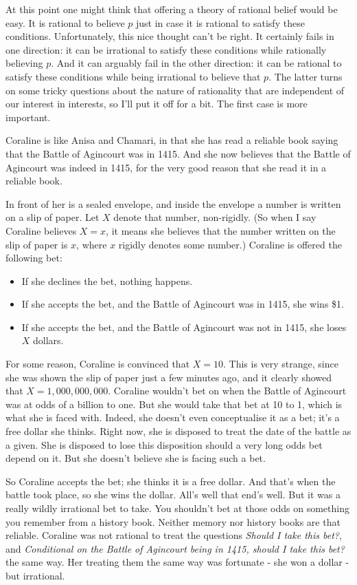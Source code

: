 \documentclass[11pt,]{book}
\providecommand{\tightlist}{%
  \setlength{\itemsep}{0pt}\setlength{\parskip}{0pt}}
\begin{document}
At this point one might think that offering a theory of rational belief would be easy. It is rational to believe \(p\) just in case it is rational to satisfy these conditions. Unfortunately, this nice thought can't be right. It certainly fails in one direction: it can be irrational to satisfy these conditions while rationally believing \(p\). And it can arguably fail in the other direction: it can be rational to satisfy these conditions while being irrational to believe that \(p\). The latter turns on some tricky questions about the nature of rationality that are independent of our interest in interests, so I'll put it off for a bit. The first case is more important.

Coraline is like Anisa and Chamari, in that she has read a reliable book saying that the Battle of Agincourt was in 1415. And she now believes that the Battle of Agincourt was indeed in 1415, for the very good reason that she read it in a reliable book.

In front of her is a sealed envelope, and inside the envelope a number is written on a slip of paper. Let \(X\) denote that number, non-rigidly. (So when I say Coraline believes \(X = x\), it means she believes that the number written on the slip of paper is \(x\), where \(x\) rigidly denotes some number.) Coraline is offered the following bet:

\begin{itemize}
\tightlist
\item
  If she declines the bet, nothing happens.
\item
  If she accepts the bet, and the Battle of Agincourt was in 1415, she wins \$1.
\item
  If she accepts the bet, and the Battle of Agincourt was not in 1415, she loses \(X\) dollars.
\end{itemize}

For some reason, Coraline is convinced that \(X = 10\). This is very strange, since she was shown the slip of paper just a few minutes ago, and it clearly showed that \(X = 1,000,000,000\). Coraline wouldn't bet on when the Battle of Agincourt was at odds of a billion to one. But she would take that bet at 10 to 1, which is what she is faced with. Indeed, she doesn't even conceptualise it as a bet; it's a free dollar she thinks. Right now, she is disposed to treat the date of the battle as a given. She is disposed to lose this disposition should a very long odds bet depend on it. But she doesn't believe she is facing such a bet.

So Coraline accepts the bet; she thinks it is a free dollar. And that's when the battle took place, so she wins the dollar. All's well that end's well. But it was a really wildly irrational bet to take. You shouldn't bet at those odds on something you remember from a history book. Neither memory nor history books are that reliable. Coraline was not rational to treat the questions \emph{Should I take this bet?}, and \emph{Conditional on the Battle of Agincourt being in 1415, should I take this bet?} the same way. Her treating them the same way was fortunate - she won a dollar - but irrational.
\end{document}
